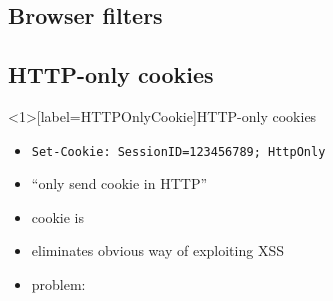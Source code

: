 \subsection{Browser filters}



\subsection{HTTP-only cookies}


\begin{frame}<1>[label=HTTPOnlyCookie]{HTTP-only cookies}
    \begin{itemize}
    \item \texttt{Set-Cookie: SessionID=123456789; HttpOnly}
    \item ``only send cookie in HTTP''
    \item cookie is 
    \item eliminates obvious way of exploiting XSS
    \item problem: 
    \end{itemize}
\end{frame}
